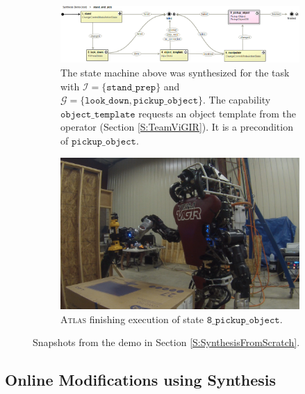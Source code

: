 \begin{figure}[t]
	\centering
	\begin{subfigure}[b]{0.99\columnwidth}
	\includegraphics[width=0.99\columnwidth,clip]{./img/stand_and_pick_sm.png}
	\caption{
	The state machine above was synthesized for the task with $\mathcal{I} = \{ \mathtt{stand\_prep} \}$ and $\mathcal{G} = \{ \mathtt{look\_down}, \mathtt{pickup\_object} \}$.
	The capability $\mathtt{object\_template}$ requests an object template from the operator (Section \ref{S:TeamViGIR}).
	It is a precondition of $\mathtt{pickup\_object}$.
	}
	\label{Fig:stand_and_pick_sm}
	\end{subfigure}
	
	\vspace{4 pt}
	\begin{subfigure}[b]{0.95\columnwidth}
	\includegraphics[width=0.99\columnwidth, clip]{./img/stand_and_pick_gopro.png}
	\caption{\textsc{Atlas} finishing execution of state $\mathtt{8\_pickup\_object}$.
	} 
	\label{Fig:stand_and_pick_gopro}
	\end{subfigure}
	\caption{
	Snapshots from the demo in Section \ref{S:SynthesisFromScratch}.
	}
	\label{Fig:stand_and_pick_demo}
\end{figure}

\subsection{Online Modifications using Synthesis}\label{S:RuntimeSynthesis}

